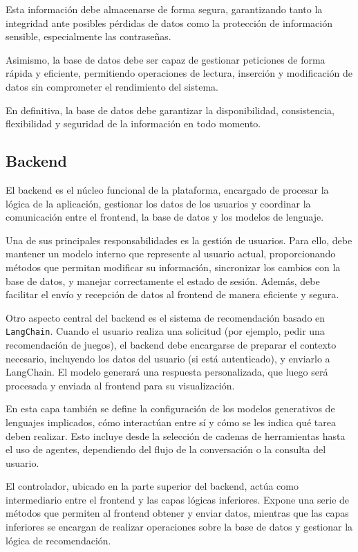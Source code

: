 Esta información debe almacenarse de forma segura, garantizando tanto la integridad ante posibles pérdidas de datos como la protección de información sensible, especialmente las contraseñas.

Asimismo, la base de datos debe ser capaz de gestionar peticiones de forma rápida y eficiente, permitiendo operaciones de lectura, inserción y modificación de datos sin comprometer el rendimiento del sistema.

En definitiva, la base de datos debe garantizar la disponibilidad, consistencia, flexibilidad y seguridad de la información en todo momento.


\subsection{Backend}

El backend es el núcleo funcional de la plataforma, encargado de procesar la lógica de la aplicación, gestionar los datos de los usuarios y coordinar la comunicación entre el frontend, la base de datos y los modelos de lenguaje.

Una de sus principales responsabilidades es la gestión de usuarios. Para ello, debe mantener un modelo interno que represente al usuario actual, proporcionando métodos que permitan modificar su información, sincronizar los cambios con la base de datos, y manejar correctamente el estado de sesión. Además, debe facilitar el envío y recepción de datos al frontend de manera eficiente y segura.

Otro aspecto central del backend es el sistema de recomendación basado en \texttt{LangChain}. Cuando el usuario realiza una solicitud (por ejemplo, pedir una recomendación de juegos), el backend debe encargarse de preparar el contexto necesario, incluyendo los datos del usuario (si está autenticado), y enviarlo a LangChain. El modelo generará una respuesta personalizada, que luego será procesada y enviada al frontend para su visualización.

En esta capa también se define la configuración de los modelos generativos de lenguajes implicados, cómo interactúan entre sí y cómo se les indica qué tarea deben realizar. Esto incluye desde la selección de cadenas de herramientas hasta el uso de agentes, dependiendo del flujo de la conversación o la consulta del usuario.

El controlador, ubicado en la parte superior del backend, actúa como intermediario entre el frontend y las capas lógicas inferiores. Expone una serie de métodos que permiten al frontend obtener y enviar datos, mientras que las capas inferiores se encargan de realizar operaciones sobre la base de datos y gestionar la lógica de recomendación.

